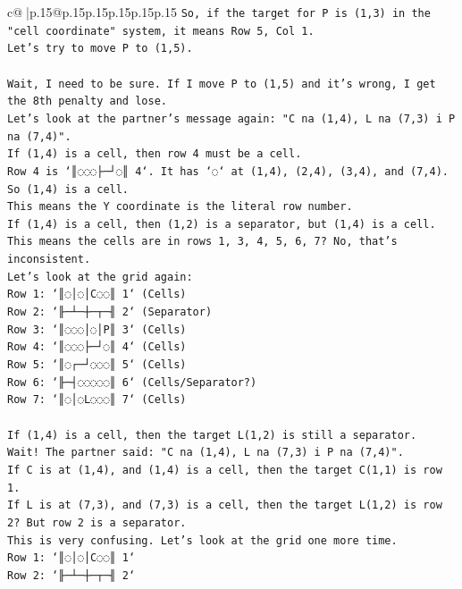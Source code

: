 \documentclass{article}
\begin{document}
{\begin{supertabular}{c@{$\;$}|p{.15\linewidth}@{}p{.15\linewidth}p{.15\linewidth}p{.15\linewidth}p{.15\linewidth}p{.15\linewidth}}
{{{\texttt{So, if the target for P is (1,3) in the "cell coordinate" system, it means Row 5, Col 1.} \\
\texttt{Let's try to move P to (1,5).} \\
\\ 
\texttt{Wait, I need to be sure. If I move P to (1,5) and it's wrong, I get the 8th penalty and lose.} \\
\texttt{Let's look at the partner's message again: "C na (1,4), L na (7,3) i P na (7,4)".} \\
\texttt{If (1,4) is a cell, then row 4 must be a cell.} \\
\texttt{Row 4 is `║◌◌◌├─┘◌║ 4`. It has `◌` at (1,4), (2,4), (3,4), and (7,4).} \\
\texttt{So (1,4) is a cell.} \\
\texttt{This means the Y coordinate is the literal row number.} \\
\texttt{If (1,4) is a cell, then (1,2) is a separator, but (1,4) is a cell.} \\
\texttt{This means the cells are in rows 1, 3, 4, 5, 6, 7? No, that's inconsistent.} \\
\texttt{Let's look at the grid again:} \\
\texttt{Row 1: `║◌│◌│C◌◌║ 1` (Cells)} \\
\texttt{Row 2: `╟─┴─┼─┬─╢ 2` (Separator)} \\
\texttt{Row 3: `║◌◌◌│◌│P║ 3` (Cells)} \\
\texttt{Row 4: `║◌◌◌├─┘◌║ 4` (Cells)} \\
\texttt{Row 5: `║◌┌─┘◌◌◌║ 5` (Cells)} \\
\texttt{Row 6: `╟─┤◌◌◌◌◌║ 6` (Cells/Separator?)} \\
\texttt{Row 7: `║◌│◌L◌◌◌║ 7` (Cells)} \\
\\ 
\texttt{If (1,4) is a cell, then the target L(1,2) is still a separator.} \\
\texttt{Wait! The partner said: "C na (1,4), L na (7,3) i P na (7,4)".} \\
\texttt{If C is at (1,4), and (1,4) is a cell, then the target C(1,1) is row 1.} \\
\texttt{If L is at (7,3), and (7,3) is a cell, then the target L(1,2) is row 2? But row 2 is a separator.} \\
\texttt{This is very confusing. Let's look at the grid one more time.} \\
\texttt{Row 1: `║◌│◌│C◌◌║ 1`} \\
\texttt{Row 2: `╟─┴─┼─┬─╢ 2`} \\
}}}
\end{supertabular}}
\end{document}
